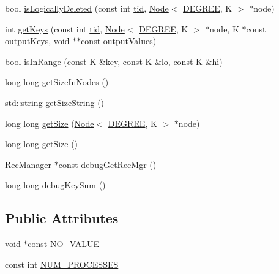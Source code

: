 \begin{DoxyCompactItemize}
\item 
bool \hyperlink{classabtree__ns_1_1abtree_a761421fc00ce8627918f1a64c0188b6b}{is\+Logically\+Deleted} (const int \hyperlink{microbench_2main_8cpp_a9ca9869868fe7e7a38a921cc7de4103f}{tid}, \hyperlink{structabtree__ns_1_1Node}{Node}$<$ \hyperlink{brown__sigouin__abtree__kcas_2adapter_8h_a5d88b17d70c985f2f2b8e987037fd6dd}{D\+E\+G\+R\+EE}, K $>$ $\ast$node)
\item 
int \hyperlink{classabtree__ns_1_1abtree_a4cfae3349019ae80be93fc0806449250}{get\+Keys} (const int \hyperlink{microbench_2main_8cpp_a9ca9869868fe7e7a38a921cc7de4103f}{tid}, \hyperlink{structabtree__ns_1_1Node}{Node}$<$ \hyperlink{brown__sigouin__abtree__kcas_2adapter_8h_a5d88b17d70c985f2f2b8e987037fd6dd}{D\+E\+G\+R\+EE}, K $>$ $\ast$node, K $\ast$const output\+Keys, void $\ast$$\ast$const output\+Values)
\item 
bool \hyperlink{classabtree__ns_1_1abtree_ad58b181e12c77651b3e589617f94c1f5}{is\+In\+Range} (const K \&key, const K \&lo, const K \&hi)
\item 
long long \hyperlink{classabtree__ns_1_1abtree_af3fa6cabe01588518bf742b6fa951895}{get\+Size\+In\+Nodes} ()
\item 
std\+::string \hyperlink{classabtree__ns_1_1abtree_a2d3de27451d8f4ace50883760b88b37c}{get\+Size\+String} ()
\item 
long long \hyperlink{classabtree__ns_1_1abtree_a2da603531e2fbd1d4ed0f7dd869b419a}{get\+Size} (\hyperlink{structabtree__ns_1_1Node}{Node}$<$ \hyperlink{brown__sigouin__abtree__kcas_2adapter_8h_a5d88b17d70c985f2f2b8e987037fd6dd}{D\+E\+G\+R\+EE}, K $>$ $\ast$node)
\item 
long long \hyperlink{classabtree__ns_1_1abtree_aab64503fd00b60c5badb7bbe492895b1}{get\+Size} ()
\item 
Rec\+Manager $\ast$const \hyperlink{classabtree__ns_1_1abtree_a6fa33b8da342f9df9d17e2efeb4fd753}{debug\+Get\+Rec\+Mgr} ()
\item 
long long \hyperlink{classabtree__ns_1_1abtree_a68b1790129b4a9733717d32d0d9c572a}{debug\+Key\+Sum} ()
\end{DoxyCompactItemize}
\subsection*{Public Attributes}
\begin{DoxyCompactItemize}
\item 
void $\ast$const \hyperlink{classabtree__ns_1_1abtree_a2dc9189b41d67210137ac6b11bd0a780}{N\+O\+\_\+\+V\+A\+L\+UE}
\item 
const int \hyperlink{classabtree__ns_1_1abtree_aad875d05d7ea76e4790313d4b21efae3}{N\+U\+M\+\_\+\+P\+R\+O\+C\+E\+S\+S\+ES}
\end{DoxyCompactItemize}


